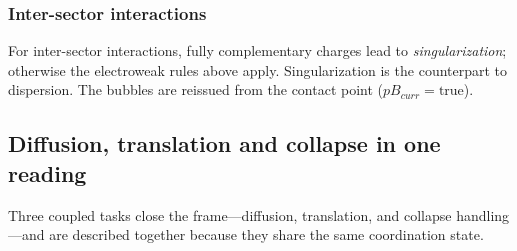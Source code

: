 \documentclass{ijuc}
\begin{document}
\subsubsection{Inter-sector interactions}
For inter-sector interactions, fully complementary charges lead to \textit{singularization}; otherwise the electroweak rules above apply. Singularization is the counterpart to dispersion.
The bubbles are reissued from the contact point ($pB_{curr}=\text{true}$).
\subsection{Diffusion, translation and collapse in one reading}\label{subsec:translation}
Three coupled tasks close the frame---diffusion, translation, and collapse handling---and are described together because they share the same coordination state.
\end{document}
